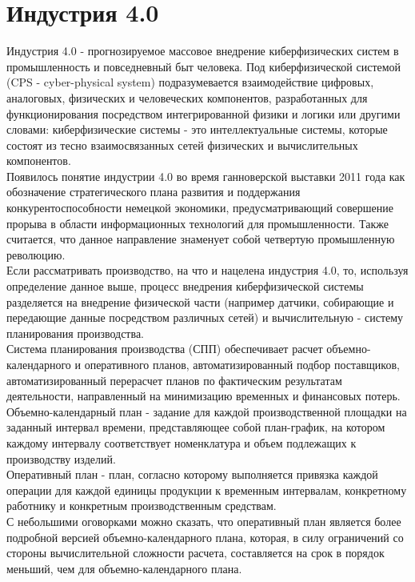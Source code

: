 \section{Индустрия 4.0}
Индустрия 4.0 - прогнозируемое массовое внедрение киберфизических систем в промышленность и повседневный быт человека.
Под киберфизической системой (CPS - cyber-physical system) подразумевается взаимодействие цифровых, аналоговых, физических и человеческих компонентов, разработанных для функционирования посредством интегрированной физики и логики или другими словами: киберфизические системы - это интеллектуальные системы, которые состоят из тесно взаимосвязанных сетей физических и вычислительных компонентов.\cite{nist}\\
\indent Появилось понятие индустрии 4.0 во время ганноверской выставки 2011 года как обозначение стратегического плана развития и поддержания конкурентоспособности немецкой экономики, предусматривающий совершение прорыва в области информационных технологий для промышленности.
Также считается, что данное направление знаменует собой четвертую промышленную революцию.\cite{industry}\\
\indent Если рассматривать производство, на что и нацелена индустрия 4.0, то, используя определение данное выше, процесс внедрения киберфизической системы разделяется на внедрение физической части (например датчики, собирающие и передающие данные посредством различных сетей) и вычислительную - систему планирования производства.\\
\indent Система планирования производства (СПП) обеспечивает расчет объемно-календарного и оперативного планов, автоматизированный подбор поставщиков, автоматизированный перерасчет планов по фактическим результатам деятельности, направленный на минимизацию временных и финансовых потерь.\\
\indent Объемно-календарный план - задание для каждой производственной площадки на заданный интервал времени, представляющее собой план-график, на котором каждому интервалу соответствует номенклатура и объем подлежащих к производству изделий.\cite{niokr}\\
\indent Оперативный план - план, согласно которому выполняется привязка каждой операции для каждой единицы продукции к временным интервалам, конкретному работнику и конкретным производственным средствам.\cite{niokr}\\
\indent С небольшими оговорками можно сказать, что оперативный план является более подробной версией объемно-календарного плана, которая, в силу ограничений со стороны вычислительной сложности расчета, составляется на срок в порядок меньший, чем для объемно-календарного плана.
